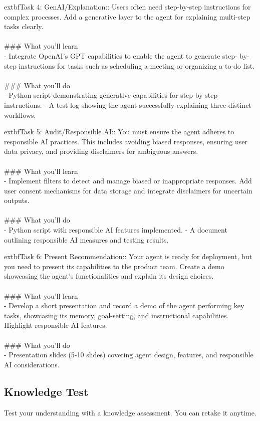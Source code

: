 \documentclass{article}
\begin{document}
	extbf{Task 4:} GenAI/Explanation:: Users often need step-by-step instructions for complex processes. Add a generative layer to the agent for explaining multi-step tasks clearly. \\
 \\
### What you'll learn \\
- Integrate OpenAI’s GPT capabilities to enable the agent to generate step- by-step instructions for tasks such as scheduling a meeting or organizing a to-do list. \\
 \\
### What you'll do \\
- Python script demonstrating generative capabilities for step-by-step instructions. - A test log showing the agent successfully explaining three distinct workflows.

	extbf{Task 5:} Audit/Responsible AI:: You must ensure the agent adheres to responsible AI practices. This includes avoiding biased responses, ensuring user data privacy, and providing disclaimers for ambiguous answers. \\
 \\
### What you'll learn \\
- Implement filters to detect and manage biased or inappropriate responses. Add user consent mechanisms for data storage and integrate disclaimers for uncertain outputs. \\
 \\
### What you'll do \\
- Python script with responsible AI features implemented. - A document outlining responsible AI measures and testing results.

	extbf{Task 6:} Present Recommendation:: Your agent is ready for deployment, but you need to present its capabilities to the product team. Create a demo showcasing the agent’s functionalities and explain its design choices. \\
 \\
### What you'll learn \\
- Develop a short presentation and record a demo of the agent performing key tasks, showcasing its memory, goal-setting, and instructional capabilities. Highlight responsible AI features. \\
 \\
### What you'll do \\
- Presentation slides (5-10 slides) covering agent design, features, and responsible AI considerations.

\subsection*{Knowledge Test}
Test your understanding with a knowledge assessment. You can retake it anytime.\\
\end{document}
